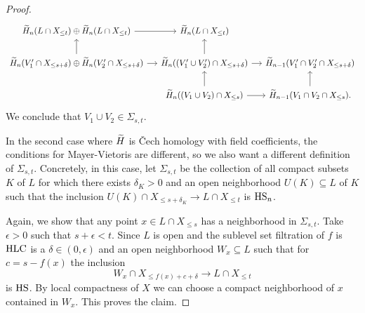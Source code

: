 \begin{proof}
\begin{equation*}
\begin{tikzcd}[column sep=small]
	\H_n(L \cap X_{\leq t}) \oplus \H_n(L \cap X_{\leq t}) \arrow[r] &
	\H_n(L \cap X_{\leq t}) & \\
	\H_{n}(V_1^\prime \cap X_{\leq s+\delta}) \oplus \H_n(V_2^\prime \cap X_{\leq s+\delta}) \arrow[r] \arrow[u] & 
	\H_{n}((V_1^\prime \cup V_2^\prime) \cap X_{\leq s+\delta}) \arrow[r] \arrow[u] &
	\H_{n-1}(V_1^\prime \cap V_2^\prime \cap X_{\leq s+\delta}) \\ & 
	\H_{n}((V_1 \cup V_2) \cap X_{\leq s}) \arrow[r] \arrow[u] &
	\H_{n-1}(V_1 \cap V_2 \cap X_{\leq s}). \arrow[u]
	\end{tikzcd}
	\end{equation*}
	We conclude that $V_1 \cup V_2 \in \Sigma_{s, t}$.
	
	In the second case where $\widetilde{H}$ is \v{C}ech homology with field coefficients, the conditions for Mayer-Vietoris are different, so we also want a different definition of $\Sigma_{s,t}$. Concretely, in this case, let $\Sigma_{s, t}$ be the collection of all compact subsets $K$ of $L$ for which there exists $\delta_K > 0$ and an open neighborhood $U(K) \subseteq L$ of $K$ such that the inclusion $U(K) \cap X_{\leq s+\delta_K} \to L \cap X_{\leq t}$ is $\mathrm{HS}_n$.
	
	Again, we show that any point $x \in L \cap X_{\leq s}$ has a neighborhood in $\Sigma_{s, t}$.
	Take $\epsilon > 0$ such that $s + \epsilon < t$.
 	Since $L$ is open and the sublevel set filtration of $f$ is $\mathrm{HLC}$ is a $\delta \in (0, \epsilon)$ and an open neighborhood $W_x \subseteq L$ such that for $c = s - f(x)$ the inclusion 
 	\begin{equation*}
 	W_x \cap X_{\leq f(x) + c + \delta} \to
 	L \cap X_{\leq t}
 	\end{equation*}
 	is $\mathrm{HS}$.
 	By local compactness of $X$ we can choose a compact neighborhood of $x$ contained in $W_x$.
 	This proves the claim.
 	

\end{proof}
